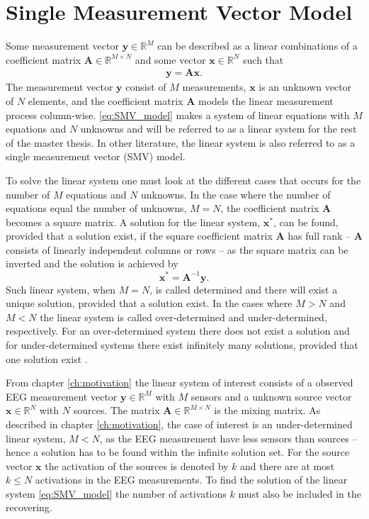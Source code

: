 \section{Single Measurement Vector Model}
Some measurement vector $\mathbf{y} \in \mathbb{R}^M$ can be described as a linear combinations of a coefficient matrix $\mathbf{A} \in \mathbb{R}^{M \times N}$ and some vector $\mathbf{x} \in \mathbb{R}^N$ such that
\begin{align}\label{eq:SMV_model}
\mathbf{y} = \mathbf{Ax}.
\end{align}
The measurement vector $\mathbf{y}$ consist of $M$ measurements, $\mathbf{x}$ is an unknown vector of $N$ elements, and the coefficient matrix $\mathbf{A}$ models the linear measurement process column-wise. 
\ref{eq:SMV_model} makes a system of linear equations with $M$ equations and $N$ unknowns and will be referred to as a linear system for the rest of the master thesis. In other literature, the linear system is also referred to as a single measurement vector (SMV) model.

To solve the linear system one must look at the different cases that occurs for the number of $M$ equations and $N$ unknowns.
In the case where the number of equations equal the number of unknowns, $M = N$, the coefficient matrix $\mathbf{A}$ becomes a square matrix. 
A solution for the linear system, $\mathbf{x}^\ast$, can be found, provided that a solution exist, if the square coefficient matrix $\mathbf{A}$ has full rank -- $\mathbf{A}$ consists of linearly independent columns or rows -- as the square matrix can be inverted and the solution is achieved by 
$$
\mathbf{x}^\ast = \mathbf{A}^{-1} \mathbf{y}.
$$
Such linear system, when $M = N$, is called determined and there will exist a unique solution, provided that a solution exist. 
In the cases where $M > N$ and $M < N$ the linear system is called over-determined and under-determined, respectively. 
For an over-determined system there does not exist a solution and for under-determined systems there exist infinitely many solutions, provided that one solution exist \cite[p. ix]{CS} .

From chapter \ref{ch:motivation} the linear system of interest consists of a observed EEG measurement vector $\mathbf{y} \in \mathbb{R}^M$ with $M$ sensors and a unknown source vector $\mathbf{x} \in \mathbb{R}^N$ with $N$ sources. 
The matrix $\mathbf{A} \in \mathbb{R}^{M \times N}$ is the mixing matrix.
As described in chapter \ref{ch:motivation}, the case of interest is an under-determined linear system, $M < N$, as the EEG measurement have less sensors than sources -- hence a solution has to be found within the infinite solution set. 
For the source vector $\mathbf{x}$ the activation of the sources is denoted by $k$ and there are at most $k \leq N$ activations in the EEG measurements. 
To find the solution of the linear system \eqref{eq:SMV_model} the number of activations $k$ must also be included in the recovering.

